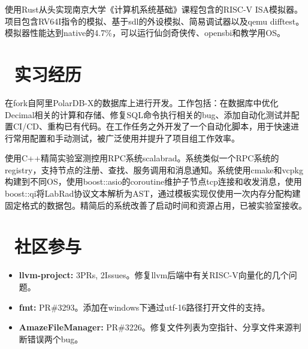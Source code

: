 \documentclass{resume}
\begin{document}
\begin{onehalfspacing}
  使用Rust从头实现南京大学《计算机系统基础》课程包含的RISC-V ISA模拟器。项目包含RV64I指令的模拟、基于sdl的外设模拟、简易调试器以及qemu difftest。模拟器性能达到native的4.7\%，可以运行仙剑奇侠传、opensbi和教学用OS。
\end{onehalfspacing}




\section{\faUsers\ 实习经历}
\begin{onehalfspacing}
  在fork自阿里PolarDB-X的数据库上进行开发。工作包括：在数据库中优化Decimal相关的计算和存储、修复SQL命令执行相关的bug、添加自动化测试并配置CI/CD、重构已有代码。在工作任务之外开发了一个自动化脚本，用于快速进行常用配置和手动测试，被广泛使用并提升了项目组工作效率。
\end{onehalfspacing}

\begin{onehalfspacing}
  使用C++精简实验室测控用RPC系统scalabrad。系统类似一个RPC系统的registry，支持节点的注册、查找、服务调用和消息通知。系统使用cmake和vcpkg构建到不同OS，使用boost::asio的coroutine维护子节点tcp连接和收发消息，使用boost::qi将LabRad协议文本解析为AST，通过模板实现仅使用一次内存分配构建固定格式的数据包。精简后的系统改善了启动时间和资源占用，已被实验室接收。
\end{onehalfspacing}

\section{\faGithub\ 社区参与}
\begin{itemize}[parsep=0.5ex]
  \item {\large \textbf{llvm-project:}} 3PRs, 2Issues。修复llvm后端中有关RISC-V向量化的几个问题。
  \item {\large \textbf{fmt:}} PR\#3293。添加在windows下通过utf-16路径打开文件的支持。
  \item {\large \textbf{AmazeFileManager:}} PR\#3226。修复文件列表为空指针、分享文件来源判断错误两个bug。
\end{itemize}
\end{document}
